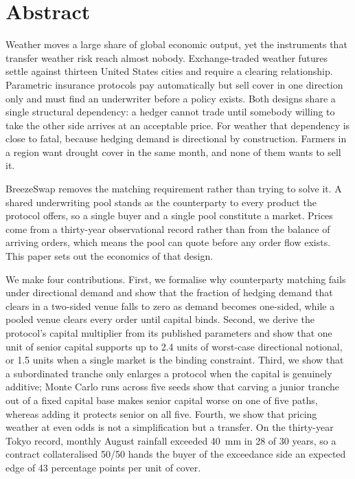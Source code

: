 \documentclass[11pt,a4paper]{article}
\begin{document}
\section*{Abstract}

Weather moves a large share of global economic output, yet the instruments that transfer
weather risk reach almost nobody. Exchange-traded weather futures settle against thirteen
United States cities and require a clearing relationship. Parametric insurance protocols
pay automatically but sell cover in one direction only and must find an underwriter before
a policy exists. Both designs share a single structural dependency: a hedger cannot trade
until somebody willing to take the other side arrives at an acceptable price. For weather
that dependency is close to fatal, because hedging demand is directional by construction.
Farmers in a region want drought cover in the same month, and none of them wants to sell it.

BreezeSwap removes the matching requirement rather than trying to solve it. A shared
underwriting pool stands as the counterparty to every product the protocol offers, so a
single buyer and a single pool constitute a market. Prices come from a thirty-year
observational record rather than from the balance of arriving orders, which means the pool
can quote before any order flow exists. This paper sets out the economics of that design.

We make four contributions. First, we formalise why counterparty matching fails under
directional demand and show that the fraction of hedging demand that clears in a two-sided
venue falls to zero as demand becomes one-sided, while a pooled venue clears every order
until capital binds. Second, we derive the protocol's capital multiplier from its published
parameters and show that one unit of senior capital supports up to 2.4 units of worst-case
directional notional, or 1.5 units when a single market is the binding constraint. Third,
we show that a subordinated tranche only enlarges a protocol when the capital is genuinely
additive; Monte Carlo runs across five seeds show that carving a junior tranche out of a
fixed capital base makes senior capital worse on one of five paths, whereas adding it
protects senior on all five. Fourth, we show that pricing weather at even odds is not a
simplification but a transfer. On the thirty-year Tokyo record, monthly August rainfall
exceeded 40~mm in 28 of 30 years, so a contract collateralised 50/50 hands the buyer of the
exceedance side an expected edge of 43 percentage points per unit of cover.
\end{document}
